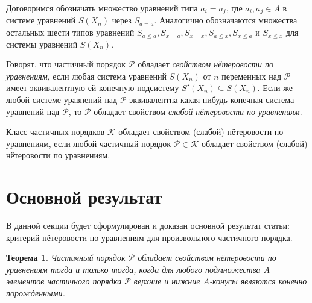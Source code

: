 \documentclass[12pt]{article}
\theoremstyle{break}
\newtheorem{Th}{Теорема}
\def\P{\mathcal{P}}
\begin{document}
		Договоримся обозначать множество уравнений типа $a_i=a_j$, где $a_i, a_j\in A$ в системе уравнений $S(X_n)$ через $S_{a=a}$. Аналогично обозначаются множества остальных шести типов уравнений $S_{a\leqslant a}, S_{x=a}, S_{x=x}, S_{a\leqslant x}, S_{x\leqslant a}$ и $ S_{x\leqslant x}$ для системы уравнений $S(X_n)$.
		
		Говорят, что частичный порядок $\P$ обладает \textit{свойством нётеровости по уравнениям}, если любая система уравнений $S(X_n)$ от $n$ переменных над $\P$ имеет эквивалентную ей конечную подсистему $S'(X_n) \subseteq S(X_n)$. Если же любой системе уравнений над $\P$ эквивалентна какая-нибудь конечная система уравнений над $\P$, то $\P$ обладает свойством \textit{слабой нётеровости по уравнениям}.
		
		Класс частичных порядков $\mathcal{K}$ обладает свойством (слабой) нётеровости по уравнениям, если любой частичный порядок $\P \in \mathcal{K}$ обладает свойством (слабой) нётеровости по уравнениям.
		
	
	\section{Основной результат}
		В данной секции будет сформулирован и доказан основной результат статьи: критерий нётеровости по уравнениям для произвольного частичного порядка.

		\begin{Th}\label{criterion}
			Частичный порядок $\P$ обладает свойством нётеровости по уравнениям тогда и только тогда, когда для любого подмножества $A$ элементов частичного порядка $\P$ верхние и нижние $A$-конусы являются конечно порожденными.
		\end{Th}
\end{document}
